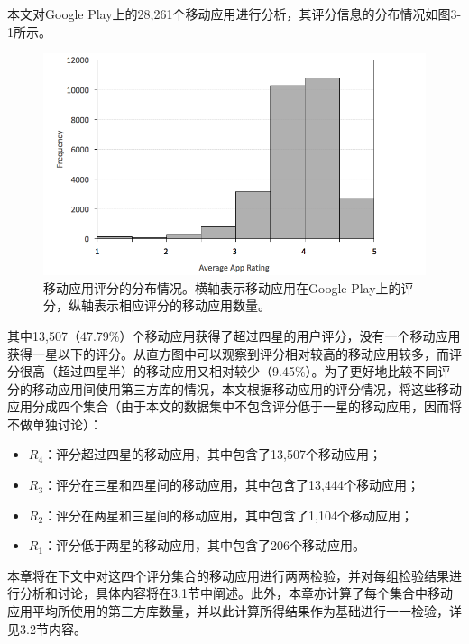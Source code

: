 本文对Google Play上的28,261个移动应用进行分析，其评分信息的分布情况如图3-1所示。
\begin{figure}
	\centering
	\includegraphics[width=5.3in]{figures/app_rating}
	\caption{移动应用评分的分布情况。横轴表示移动应用在Google Play上的评分，纵轴表示相应评分的移动应用数量。}
\end{figure}
其中13,507（47.79\%）个移动应用获得了超过四星的用户评分，没有一个移动应用获得一星以下的评分。从直方图中可以观察到评分相对较高的移动应用较多，而评分很高（超过四星半）的移动应用又相对较少（9.45\%）。为了更好地比较不同评分的移动应用间使用第三方库的情况，本文根据移动应用的评分情况，将这些移动应用分成四个集合（由于本文的数据集中不包含评分低于一星的移动应用，因而将不做单独讨论）：
\begin{itemize}
\item $R_4$：评分超过四星的移动应用，其中包含了13,507个移动应用；
\item $R_3$：评分在三星和四星间的移动应用，其中包含了13,444个移动应用；
\item $R_2$：评分在两星和三星间的移动应用，其中包含了1,104个移动应用；
\item $R_1$：评分低于两星的移动应用，其中包含了206个移动应用。
\end{itemize}

本章将在下文中对这四个评分集合的移动应用进行两两检验，并对每组检验结果进行分析和讨论，具体内容将在3.1节中阐述。此外，本章亦计算了每个集合中移动应用平均所使用的第三方库数量，并以此计算所得结果作为基础进行一一检验，详见3.2节内容。



